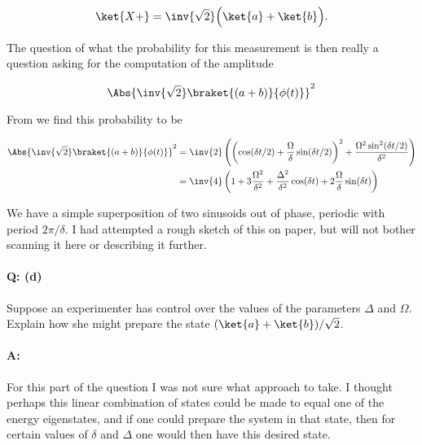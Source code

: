 {\begin{equation}\label{eqn:qmIexamPractice2008Dec:2:120}
\ket{X+} = \inv{\sqrt{2}} \Bigl( \ket{a} + \ket{b} \Bigr).
\end{equation}

The question of what the probability for this measurement is then really a question asking for the computation of the amplitude

\begin{equation}\label{eqn:qmIexamPractice2008Dec:2:130}
\Abs{
\inv{\sqrt{2}}
\braket{
 (a + b)}{\phi(t)}}^2
\end{equation}

From  we find this probability to be

\begin{equation}\label{eqn:qmIexamPractice2008Dec:710}
\begin{aligned}
\Abs{
\inv{\sqrt{2}}
\braket{
 (a + b)}{\phi(t)}}^2
&=
\inv{2} \left(
\left(\cos(\delta t/2) + \frac{\Omega}{\delta} \sin(\delta t/2)\right)^2
+ \frac{ \Omega^2 \sin^2(\delta t/2)}{\delta^2}
\right) \\
&=
\inv{4} \left( 1 + 3 \frac{\Omega^2}{\delta^2} + \frac{\Delta^2}{\delta^2} \cos (\delta t) + 2 \frac{ \Omega}{\delta} \sin(\delta t) \right)
\end{aligned}
\end{equation}

We have a simple superposition of two sinusoids out of phase, periodic with period \(2 \pi/\delta\).  I had attempted a rough sketch of this on paper, but will not bother scanning it here or describing it further.

\paragraph{Q: (d)}

Suppose an experimenter has control over the values of the parameters \(\Delta\) and \(\Omega\).  Explain how she might prepare the state \((\ket{a} + \ket{b})/\sqrt{2}\).

\paragraph{A:}

For this part of the question I was not sure what approach to take.  I thought perhaps this linear combination of states could be made to equal one of the energy eigenstates, and if one could prepare the system in that state, then for certain values of \(\delta\) and \(\Delta\) one would then have this desired state.

}
